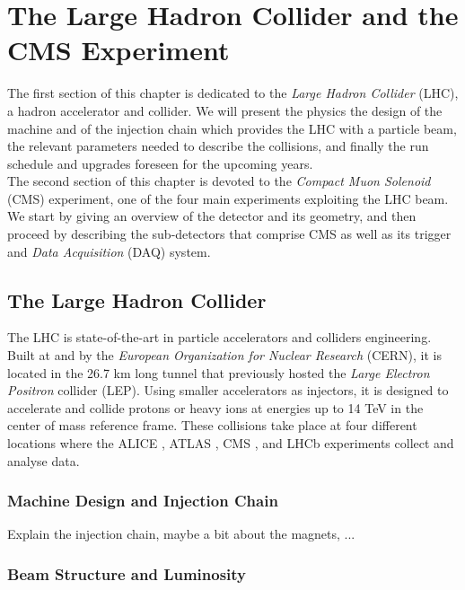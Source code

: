 \chapter{The Large Hadron Collider and the CMS Experiment}
\label{chap:lhc_cms}

    The first section of this chapter is dedicated to the \emph{Large Hadron Collider} (LHC), a hadron accelerator and collider. We will present the physics the design of the machine and of the injection chain which provides the LHC with a particle beam, the relevant parameters needed to describe the collisions, and finally the run schedule and upgrades foreseen for the upcoming years. \\

    The second section of this chapter is devoted to the \emph{Compact Muon Solenoid} (CMS) experiment, one of the four main experiments exploiting the LHC beam. We start by giving an overview of the detector and its geometry, and then proceed by describing the sub-detectors that comprise CMS as well as its trigger and \emph{Data Acquisition} (DAQ) system.

    \section{The Large Hadron Collider}

        The LHC \Cite{Evans:1129806} is state-of-the-art in particle accelerators and colliders engineering. Built at and by the \emph{European Organization for Nuclear Research} (CERN), it is located in the 26.7 km long tunnel that previously hosted the \emph{Large Electron Positron} collider (LEP). Using smaller accelerators as injectors, it is designed to accelerate and collide protons or heavy ions at energies up to 14 TeV in the center of mass reference frame. These collisions take place at four different locations where the ALICE \Cite{1748-0221-3-08-S08002}, ATLAS \Cite{1748-0221-3-08-S08003}, CMS \Cite{1748-0221-3-08-S08004}, and LHCb \Cite{1748-0221-3-08-S08005} experiments collect and analyse data.

        \subsection{Machine Design and Injection Chain}

            Explain the injection chain, maybe a bit about the magnets, ...

        \subsection{Beam Structure and Luminosity}

